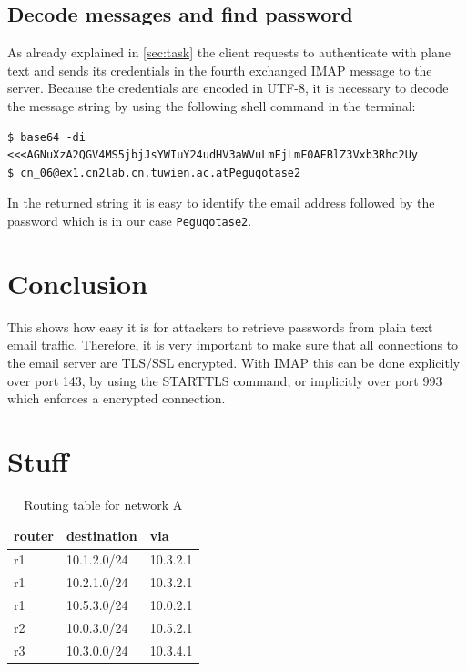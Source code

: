 \documentclass[parskip=full]{scrartcl}
\begin{document}
\subsection{Decode messages and find password} \label{subsec:decode}
As already explained in \cref{sec:task} the client requests to authenticate with plane text and sends its credentials in the fourth exchanged IMAP message to the server. 
Because the credentials are encoded in UTF-8, it is necessary to decode the message string by using the following shell command in the terminal:
\begin{verbatim}
$ base64 -di <<<AGNuXzA2QGV4MS5jbjJsYWIuY24udHV3aWVuLmFjLmF0AFBlZ3Vxb3Rhc2Uy
$ cn_06@ex1.cn2lab.cn.tuwien.ac.atPeguqotase2
\end{verbatim}
In the returned string it is easy to identify the email address followed by the password which is in our case \verb|Peguqotase2|. 
\section{Conclusion}

This shows how easy it is for attackers to retrieve passwords from plain text email traffic. Therefore, it is very important to make sure that all connections to the email server are TLS/SSL encrypted. With IMAP this can be done explicitly over port 143, by using the STARTTLS command, or implicitly over port 993 which enforces a encrypted connection.




\section{Stuff}

\begin{table}[hb]
	\centering
	\caption{Routing table for network A}
	\label{tab:routing}
	\begin{tabular}{lll}
		\toprule
		\textbf{router} & \textbf{destination} & \textbf{via}  \\ \midrule
		r1 & 10.1.2.0/24 & 10.3.2.1 \\
		r1 & 10.2.1.0/24 & 10.3.2.1 \\
		r1 & 10.5.3.0/24 & 10.0.2.1 \\
		\midrule
		r2 & 10.0.3.0/24 & 10.5.2.1 \\
		\midrule
		r3 & 10.3.0.0/24 & 10.3.4.1 \\
		\bottomrule
	\end{tabular}
\end{table}
\end{document}
